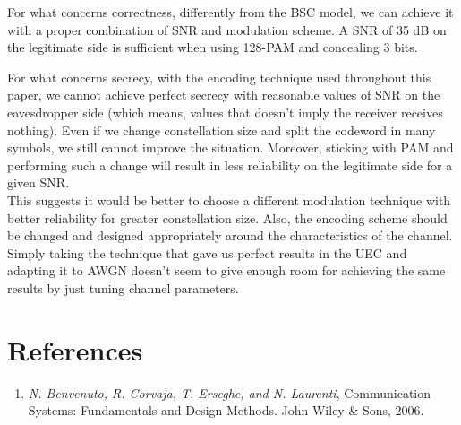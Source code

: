 \documentclass[a4paper,12pt,titlepage]{article}
\begin{document}
For what concerns correctness, differently from the BSC model, we can achieve
it with a proper combination of SNR and modulation scheme. A SNR of 35 dB on
the legitimate side is sufficient when using 128-PAM and concealing 3 bits.

For what concerns secrecy, with the encoding technique used throughout this
paper, we cannot achieve perfect secrecy with reasonable values of SNR on the
eavesdropper side (which means, values that doesn't imply the receiver receives
nothing). Even if we change constellation size and split the codeword in many
symbols, we still cannot improve the situation. Moreover, sticking with PAM and
performing such a change will result in less reliability on the legitimate side
for a given SNR. \\
This suggests it would be better to choose a different modulation technique
with better reliability for greater constellation size. Also, the encoding
scheme should be changed and designed appropriately around the characteristics
of the channel. Simply taking the technique that gave us perfect results in the
UEC and adapting it to AWGN doesn't seem to give enough room for achieving the
same results by just tuning channel parameters.

\section{References}
\begin{enumerate}
  \item \emph{N. Benvenuto, R. Corvaja, T. Erseghe, and N. Laurenti}, Communication
  Systems: Fundamentals and Design Methods. John Wiley \& Sons, 2006.
\end{enumerate}
\end{document}
